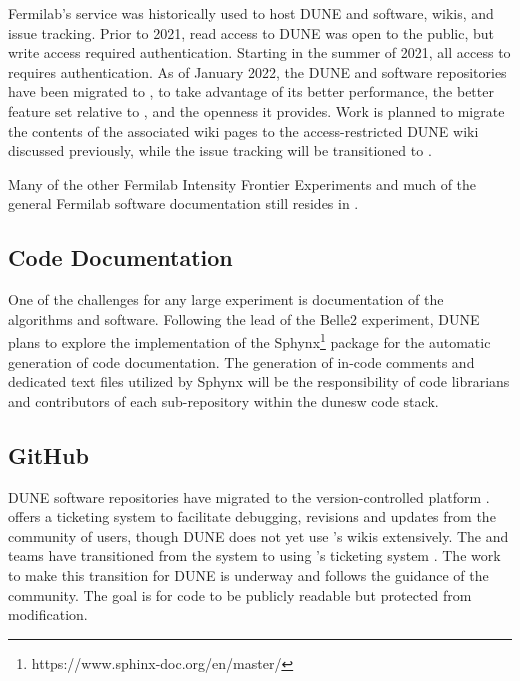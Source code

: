\documentclass[../main-v1.tex]{subfiles}
\begin{document}
Fermilab's  service was historically used to host DUNE  and  software, wikis, and issue tracking.  Prior to 2021, read access to DUNE  was open to the public, but write access required authentication.  Starting in the summer of 2021, all access to  requires authentication.  As of January 2022, the DUNE  and  software repositories have been migrated to , to take advantage of its better performance, the better feature set %
relative to , and the openness it provides. Work is planned to migrate the contents of the associated wiki pages to the access-restricted DUNE wiki discussed previously, while the issue tracking will be transitioned to .  

Many of the other Fermilab Intensity Frontier Experiments and much of the general Fermilab software documentation still resides in .

\subsection{Code Documentation}
One of the challenges for any large experiment is documentation of the algorithms and software. Following the lead of the Belle2 experiment, DUNE plans to explore the implementation of the Sphynx\footnote{https://www.sphinx-doc.org/en/master/} package for the automatic generation of code documentation. The generation of in-code comments and dedicated text files utilized by Sphynx will be the responsibility of code librarians and contributors of each sub-repository within the dunesw code stack.


\subsection{GitHub}
DUNE software repositories have migrated to the version-controlled platform .   offers a ticketing system to facilitate debugging, revisions and updates from the community of users, though DUNE does not yet use 's wikis extensively.  The  and  teams have transitioned from the  system to using 's ticketing system .  The work to make this transition for DUNE is underway and follows the guidance of the  community. %
The goal is for code to be publicly readable but protected from modification. 
\end{document}
